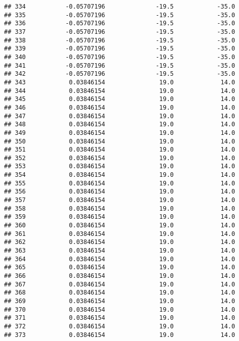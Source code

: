 \documentclass[]{article}
\begin{document}
\begin{verbatim}
## 334           -0.05707196              -19.5            -35.0
## 335           -0.05707196              -19.5            -35.0
## 336           -0.05707196              -19.5            -35.0
## 337           -0.05707196              -19.5            -35.0
## 338           -0.05707196              -19.5            -35.0
## 339           -0.05707196              -19.5            -35.0
## 340           -0.05707196              -19.5            -35.0
## 341           -0.05707196              -19.5            -35.0
## 342           -0.05707196              -19.5            -35.0
## 343            0.03846154               19.0             14.0
## 344            0.03846154               19.0             14.0
## 345            0.03846154               19.0             14.0
## 346            0.03846154               19.0             14.0
## 347            0.03846154               19.0             14.0
## 348            0.03846154               19.0             14.0
## 349            0.03846154               19.0             14.0
## 350            0.03846154               19.0             14.0
## 351            0.03846154               19.0             14.0
## 352            0.03846154               19.0             14.0
## 353            0.03846154               19.0             14.0
## 354            0.03846154               19.0             14.0
## 355            0.03846154               19.0             14.0
## 356            0.03846154               19.0             14.0
## 357            0.03846154               19.0             14.0
## 358            0.03846154               19.0             14.0
## 359            0.03846154               19.0             14.0
## 360            0.03846154               19.0             14.0
## 361            0.03846154               19.0             14.0
## 362            0.03846154               19.0             14.0
## 363            0.03846154               19.0             14.0
## 364            0.03846154               19.0             14.0
## 365            0.03846154               19.0             14.0
## 366            0.03846154               19.0             14.0
## 367            0.03846154               19.0             14.0
## 368            0.03846154               19.0             14.0
## 369            0.03846154               19.0             14.0
## 370            0.03846154               19.0             14.0
## 371            0.03846154               19.0             14.0
## 372            0.03846154               19.0             14.0
## 373            0.03846154               19.0             14.0

\end{verbatim}
\end{document}
